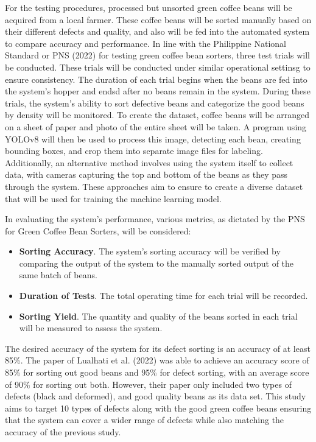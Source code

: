 For the testing procedures, processed but unsorted green coffee beans will be acquired from a local farmer. These coffee beans will be sorted manually based on their different defects and quality, and also will be fed into the automated system to compare accuracy and performance. In line with the Philippine National Standard  or PNS (2022) for testing green coffee bean sorters, three test trials will be conducted. These trials will be conducted under similar operational settinsg to ensure consistency. The duration of each trial begins when the beans are fed into the system’s hopper and endsd after no beans remain in the system. During these trials, the system’s ability to sort defective beans and categorize the good beans by density will be monitored.
To create the dataset, coffee beans will be arranged on a sheet of paper and photo of the entire sheet will be taken. A program using YOLOv8 will then be used to process this image, detecting each bean, creating bounding boxes, and crop them into separate image files for labeling. Additionally, an alternative method involves using the system itself to collect data, with cameras capturing the top and bottom of the beans as they pass through the system. These approaches aim to ensure to create a diverse dataset that will be used for training the machine learning model.

In evaluating the system’s performance, various metrics, as dictated by the PNS for Green Coffee Bean Sorters, will be considered: 
\begin{itemize}
	\item \textbf{Sorting Accuracy}. The system’s sorting accuracy will be verified by comparing the output of the system to the manually sorted output of the same batch of beans.
	\item \textbf{Duration of Tests}. The total operating time for each trial will be recorded.
	\item \textbf{Sorting Yield}. The quantity and quality of the beans sorted in each trial will be measured to assess the system.
\end{itemize}

	The desired accuracy of the system for its defect sorting is an accuracy of at least 85\%. The paper of Lualhati et al. (2022) was able to achieve an accuracy score of 85\% for sorting out good beans and 95\% for defect sorting, with an average score of 90\% for sorting out both. However, their paper only included two types of defects (black and deformed), and good quality beans as its data set. This study aims to target 10 types of defects along with the good green coffee beans ensuring that the system can cover a wider range of defects while also matching the accuracy of the previous study. 

